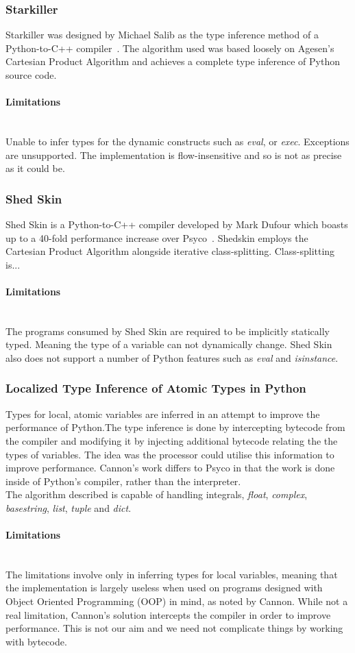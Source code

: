 \documentclass[12pt, titlepage]{article}
\begin{document}
\subsubsection{Starkiller}
Starkiller was designed by Michael Salib as the type inference method of a Python-to-C++ compiler~\cite{starkiller}. The algorithm used was based loosely on Agesen’s Cartesian Product Algorithm and achieves a complete type inference of Python source code.
\paragraph*{Limitations}\mbox{}\\
Unable to infer types for the dynamic constructs such as \textit{eval}, or \textit{exec}. Exceptions are unsupported. The implementation is flow-insensitive and so is not as precise as it could be.
\subsubsection{Shed Skin}
Shed Skin is a Python-to-C++ compiler developed by Mark Dufour which boasts up to a 40-fold performance increase over Psyco~\cite{shedskin}. Shedskin employs the Cartesian Product Algorithm alongside iterative class-splitting. Class-splitting is...
\paragraph*{Limitations}\mbox{}\\
The programs consumed by Shed Skin are required to be implicitly statically typed. Meaning the type of a variable can not dynamically change. Shed Skin also does not support a number of Python features such as \textit{eval} and \textit{isinstance}.
\subsubsection{Localized Type Inference of Atomic Types in Python}
Types for local, atomic variables are inferred in an attempt to improve the performance of Python.The type inference is done by intercepting bytecode from the compiler and modifying it by injecting additional bytecode relating the the types of variables. The idea was the processor could utilise this information to improve performance. Cannon's work differs to Psyco in that the work is done inside of Python's compiler, rather than the interpreter. \\
The algorithm described is capable of handling integrals, \textit{float}, \textit{complex}, \textit{basestring}, \textit{list}, \textit{tuple} and \textit{dict}.\paragraph{Limitations}\mbox{}\\
The limitations involve only in inferring types for local variables, meaning that the implementation is largely useless when used on programs designed with Object Oriented Programming (OOP) in mind, as noted by Cannon. While not a real limitation, Cannon's solution intercepts the compiler in order to improve performance. This is not our aim and we need not complicate things by working with bytecode.
\end{document}
